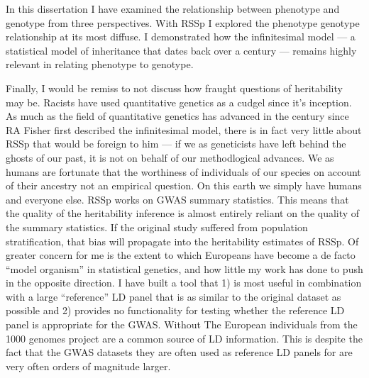 In this dissertation I have examined the relationship between phenotype and genotype from three perspectives.  With RSSp I explored the phenotype genotype relationship at its most diffuse.
I demonstrated how the infinitesimal model --- a statistical model of inheritance that dates back over a century --- remains highly relevant in relating phenotype to genotype.

Finally, I would be remiss to not discuss how fraught questions of heritability may be.  Racists have used quantitative genetics as a cudgel since it's inception.  
As much as the field of quantitative genetics has advanced in the century since RA Fisher first described the infinitesimal model, there is in
fact very little about RSSp that would be foreign to him --- if we as geneticists have left behind the ghosts of our past, it is not on behalf of our methodlogical advances.
We as humans are fortunate that the worthiness of individuals of our species on account of their ancestry not an empirical question.  On this earth we simply have humans and everyone else.
RSSp works on GWAS summary statistics.  This means that the quality of the heritability inference is almost entirely reliant on the quality of the summary statistics.  If the original study suffered from population stratification, that bias will propagate into the heritability estimates of RSSp.  Of greater concern for me is the extent to which Europeans have become a de facto ``model organism'' in statistical genetics, and how little my work has done to push in the opposite direction.  I have built a tool that 1) is most useful in combination with a large ``reference'' LD panel that is as similar to the original dataset as possible and 2) provides no functionality for testing whether the reference LD panel is appropriate for the GWAS.
Without
The European individuals from the 1000 genomes project are a common source of LD information.  This is despite the fact that the GWAS datasets they are often used as reference LD panels for are very often orders of magnitude larger.  




